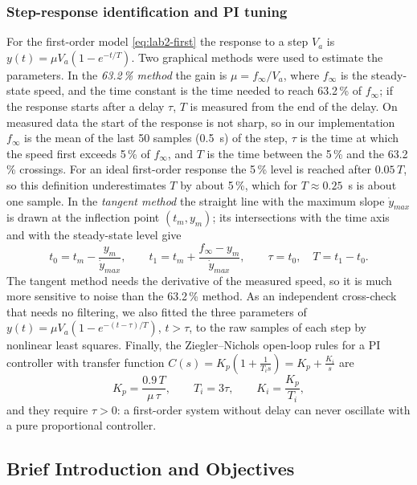 \documentclass[english]{article}
\begin{document}
\subsubsection{Step-response identification and PI tuning}

For the first-order model \eqref{eq:lab2-first} the response to a step $V_a$ is $y(t)=\mu V_a(1-e^{-t/T})$. Two
graphical methods were used to estimate the parameters. In the \emph{63.2\,\% method} the gain is $\mu=f_\infty/V_a$,
where $f_\infty$ is the steady-state speed, and the time constant is the time needed to reach 63.2\,\% of $f_\infty$;
if the response starts after a delay $\tau$, $T$ is measured from the end of the delay. On measured data the start of
the response is not sharp, so in our implementation $f_\infty$ is the mean of the last 50 samples (0.5~s) of the
step, $\tau$ is the time at which the speed first exceeds 5\,\% of $f_\infty$, and $T$ is the time between the 5\,\%
and the 63.2\,\% crossings. For an ideal first-order response the 5\,\% level is reached after $0.05\,T$, so this
definition underestimates $T$ by about 5\,\%, which for $T\approx0.25$~s is about one sample. In the \emph{tangent method}
the straight line with the maximum slope $\dot y_{max}$ is drawn at the inflection point $(t_m,y_m)$; its intersections
with the time axis and with the steady-state level give
\begin{equation}
  t_0 = t_m - \frac{y_m}{\dot y_{max}}, \qquad t_1 = t_m + \frac{f_\infty-y_m}{\dot y_{max}}, \qquad
  \tau=t_0, \quad T=t_1-t_0 .
  \label{eq:lab2-tangent}
\end{equation}
The tangent method needs the derivative of the measured speed, so it is much more sensitive to noise than the 63.2\,\%
method. As an independent cross-check that needs no filtering, we also fitted the three parameters of
$y(t)=\mu V_a(1-e^{-(t-\tau)/T})$, $t>\tau$, to the raw samples of each step by nonlinear least squares.
Finally, the Ziegler--Nichols open-loop rules for a PI controller with transfer function
$C(s)=K_p\left(1+\frac{1}{T_is}\right)=K_p+\frac{K_i}{s}$ are
\begin{equation}
  K_p = \frac{0.9\,T}{\mu\,\tau}, \qquad T_i = 3\tau, \qquad K_i = \frac{K_p}{T_i},
  \label{eq:lab2-zn}
\end{equation}
and they require $\tau>0$: a first-order system without delay can never oscillate with a pure proportional controller.

\subsection{Brief Introduction and Objectives}
\end{document}
